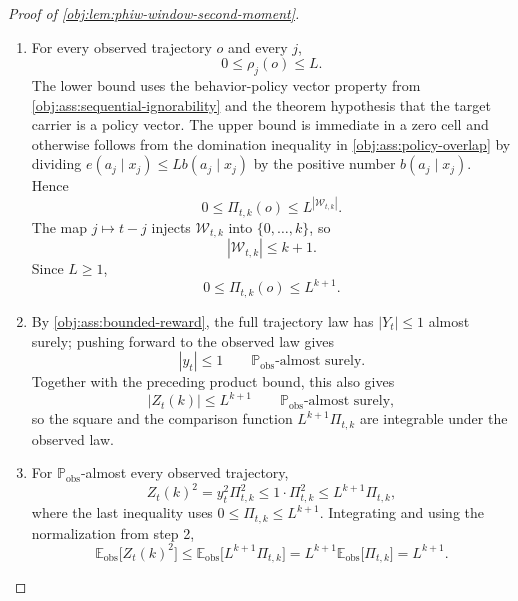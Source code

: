 \documentclass[11pt]{article}
\begin{document}
\begin{proof}[Proof of \cref{obj:lem:phiw-window-second-moment}]
\begin{enumerate}
\item
For every observed trajectory \(o\) and every \(j\),
\[
0\le \rho_j(o)\le L.
\]
The lower bound uses the behavior-policy vector property from \cref{obj:ass:sequential-ignorability} and the theorem hypothesis that the target carrier is a policy vector. The upper bound is immediate in a zero cell and otherwise follows from the domination inequality in \cref{obj:ass:policy-overlap} by dividing \(e(a_j\mid x_j)\le Lb(a_j\mid x_j)\) by the positive number \(b(a_j\mid x_j)\). Hence
\[
0\le \Pi_{t,k}(o)\le L^{|\mathcal W_{t,k}|}.
\]
The map \(j\mapsto t-j\) injects \(\mathcal W_{t,k}\) into \(\{0,\ldots,k\}\), so
\[
|\mathcal W_{t,k}|\le k+1.
\]
Since \(L\ge 1\),
\[
0\le \Pi_{t,k}(o)\le L^{k+1}.
\]

\item
By \cref{obj:ass:bounded-reward}, the full trajectory law has \(|Y_t|\le 1\) almost surely; pushing forward to the observed law gives
\[
|y_t|\le 1
\qquad \mathbb P_{\mathrm{obs}}\text{-almost surely}.
\]
Together with the preceding product bound, this also gives
\[
|Z_t(k)|\le L^{k+1}
\qquad \mathbb P_{\mathrm{obs}}\text{-almost surely},
\]
so the square and the comparison function \(L^{k+1}\Pi_{t,k}\) are integrable under the observed law.

\item
For \(\mathbb P_{\mathrm{obs}}\)-almost every observed trajectory,
\[
Z_t(k)^2
=
y_t^2\Pi_{t,k}^2
\le
1\cdot \Pi_{t,k}^2
\le
L^{k+1}\Pi_{t,k},
\]
where the last inequality uses \(0\le \Pi_{t,k}\le L^{k+1}\). Integrating and using the normalization from step 2,
\[
\mathbb E_{\mathrm{obs}}\bigl[Z_t(k)^2\bigr]
\le
\mathbb E_{\mathrm{obs}}\bigl[L^{k+1}\Pi_{t,k}\bigr]
=
L^{k+1}\mathbb E_{\mathrm{obs}}\bigl[\Pi_{t,k}\bigr]
=
L^{k+1}.
\]
\end{enumerate}
\end{proof}
\end{document}
